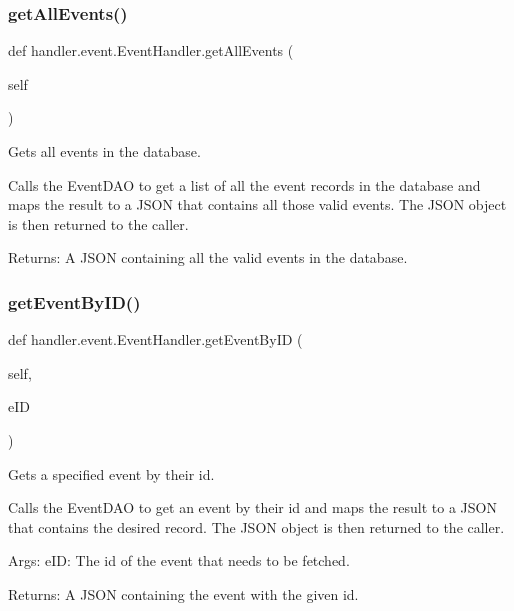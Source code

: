 \subsubsection{\texorpdfstring{get\+All\+Events()}{getAllEvents()}}
{\footnotesize\ttfamily def handler.\+event.\+Event\+Handler.\+get\+All\+Events (\begin{DoxyParamCaption}\item[{}]{self }\end{DoxyParamCaption})}

\begin{DoxyVerb}Gets all events in the database.

Calls the EventDAO to get a list of all the
event records in the database and maps the result
to a JSON that contains all those valid events.
The JSON object is then returned to the caller.

Returns:
    A JSON containing all the valid events in the 
    database.
\end{DoxyVerb}
 \mbox{\label{classhandler_1_1event_1_1_event_handler_ab5e4836ec9f0aea002d0be3f7227566e}} 
\subsubsection{\texorpdfstring{get\+Event\+By\+I\+D()}{getEventByID()}}
{\footnotesize\ttfamily def handler.\+event.\+Event\+Handler.\+get\+Event\+By\+ID (\begin{DoxyParamCaption}\item[{}]{self,  }\item[{}]{e\+ID }\end{DoxyParamCaption})}

\begin{DoxyVerb}Gets a specified event by their id.

Calls the EventDAO to get an event by their id 
and maps the result to a JSON that contains the desired 
record. The JSON object is then returned to the caller.

Args:
    eID: The id of the event that needs to be fetched.

Returns:
    A JSON containing the event with the given id.\end{DoxyVerb}
 \mbox{\label{classhandler_1_1event_1_1_event_handler_a0b5135c2269c49c58f165e428d7976fd}} 
